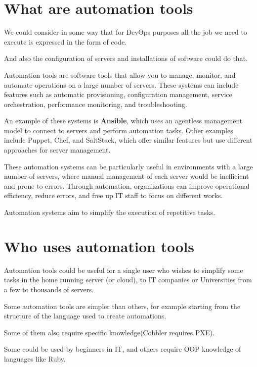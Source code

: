 \documentclass[12pt,a4paper,openright,twoside]{book}
\begin{document}
\section{What are automation tools}
We could consider in some way that for DevOps purposes all the job we need to execute is expressed in the form of code\cite{learnDevOps}.


And also the configuration of servers and installations of software could do that.


Automation tools are software tools that allow you to manage, monitor, and automate operations on a large number of servers. These systems can include features such as automatic provisioning, configuration management, service orchestration, performance monitoring, and troubleshooting.


An example of these systems is \textbf{Ansible}, which uses an agentless management model to connect to servers and perform automation tasks. Other examples include Puppet, Chef, and SaltStack, which offer similar features but use different approaches for server management.


These automation systems can be particularly useful in environments with a large number of servers, where manual management of each server would be inefficient and prone to errors. Through automation, organizations can improve operational efficiency, reduce errors, and free up IT staff to focus on different works.


Automation systems aim to simplify the execution of repetitive tasks.

\section{Who uses automation tools}
Automation tools could be useful for a single user who wishes to simplify some tasks in the home running server (or cloud), to IT companies or Universities from a few to thousands of servers.


Some automation tools are simpler than others, for example starting from the structure of the language used to create automations.


Some of them also require specific knowledge(Cobbler requires PXE).


Some could be used by beginners in IT, and others require OOP knowledge of languages like Ruby.
\end{document}
